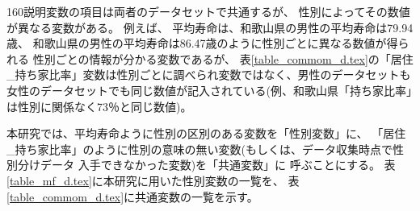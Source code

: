 160説明変数の項目は両者のデータセットで共通するが、
性別によってその数値が異なる変数がある。
例えば、
平均寿命は、和歌山県の男性の平均寿命は79.94歳、
和歌山県の男性の平均寿命は86.47歳のように性別ごとに異なる数値が得られる
性別ごとの情報が分かる変数であるが、
表\ref{table_commom_d.tex}の「居住\_持ち家比率」変数は性別ごとに調べられ変数ではなく、男性のデータセットも女性のデータセットでも同じ数値が記入されている(例、和歌山県「持ち家比率」は性別に関係なく73％と同じ数値)。

%


本研究では、平均寿命ように性別の区別のある変数を「性別変数」に、
「居住\_持ち家比率」のように性別の意味の無い変数(もしくは、データ収集時点で性別分けデータ
入手できなかった変数)を「共通変数」に
呼ぶことにする。
表\ref{table_mf_d.tex}に本研究に用いた性別変数の一覧を、
表\ref{table_commom_d.tex}に共通変数の一覧を示す。


\begin{landscape}
\end{landscape}



\begin{landscape}
\end{landscape}






%
%
%
%
%

%
%



%

